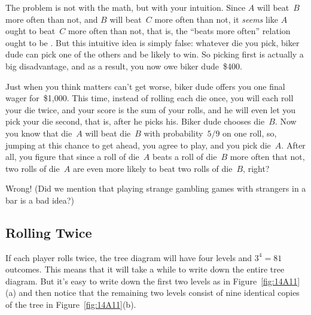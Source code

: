 \iffalse

The tree diagram and outcome probabilities for $B$ versus~$C$ are
shown in Figure~\ref{fig:14A10}.  The data there show that
\emph{die~$B$} wins with probability~$5/9$.

\begin{figure}

\graphic{Fig_A10}

\caption{The tree diagram for one roll of die~$B$ versus die~$C$.
  Die~$B$ wins with probability~$5/9$.}

\label{fig:14A10}

\end{figure}
\fi

The problem is not with the math, but with your intuition.  Since $A$
will beat~$B$ more often than not, and $B$ will beat~$C$ more often
than not, it \emph{seems} like $A$ ought to beat~$C$ more often than
not, that is, the ``beats more often'' relation ought to be
\emph{}.  But this intuitive idea is simply false:
whatever die you pick, biker dude can pick one of the others and be
likely to win.  So picking first is actually a big disadvantage, and
as a result, you now owe biker dude~\$400.

Just when you think matters can't get worse, biker dude offers you one
final wager for~\$1,000.  This time, instead of rolling each die once,
you will each roll your die twice, and your score is the sum of your
rolls, and he will even let you pick your die second, that is, after
he picks his.  Biker dude chooses die~$B$.  Now you know that die~$A$
will beat die~$B$ with probability~$5/9$ on one roll, so, jumping at
this chance to get ahead, you agree to play, and you pick
die~$A$.  After all, you figure that since a roll of die~$A$ beats a
roll of die~$B$ more often that not, two rolls of die~$A$ are even
more likely to beat two rolls of die~$B$, right?

Wrong! (Did we mention that playing strange gambling games with
strangers in a bar is a bad idea?)

\subsection{Rolling Twice}

If each player rolls twice, the tree diagram will have four levels and
$3^4 = 81$ outcomes.  This means that it will take a while to write
down the entire tree diagram.  But it's easy to write down the
first two levels as in Figure~\ref{fig:14A11}(a) and
then notice that the remaining two levels consist of nine identical
copies of the tree in Figure~\ref{fig:14A11}(b).

